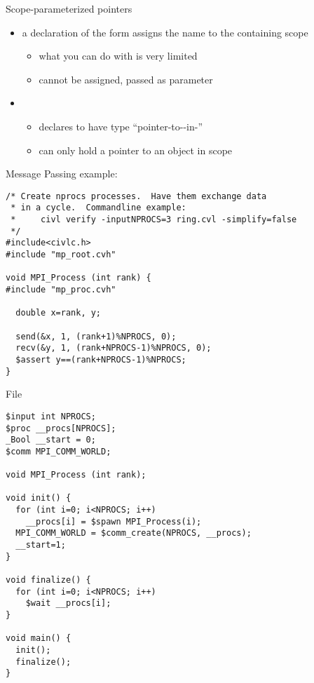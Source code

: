 \documentclass[t]{beamer}
\begin{document}
\begin{frame}{Scope-parameterized pointers}
  \begin{itemize}
  \item a declaration of the form  assigns the name
     to the containing scope
    \begin{itemize}
    \item what you can do with  is very limited
    \item cannot be assigned, passed as parameter
    \end{itemize}
  \item {}
    \begin{itemize}
    \item declares  to have type ``pointer-to--in-''
    \item {} can only hold a pointer to an object in scope 
    \end{itemize}
  \end{itemize}
\end{frame}









\begin{frame}[containsverbatim]{Message Passing example: }

\begin{verbatim}
/* Create nprocs processes.  Have them exchange data
 * in a cycle.  Commandline example:
 *     civl verify -inputNPROCS=3 ring.cvl -simplify=false
 */
#include<civlc.h>
#include "mp_root.cvh"

void MPI_Process (int rank) {
#include "mp_proc.cvh"

  double x=rank, y;

  send(&x, 1, (rank+1)%NPROCS, 0);
  recv(&y, 1, (rank+NPROCS-1)%NPROCS, 0);
  $assert y==(rank+NPROCS-1)%NPROCS;
}
\end{verbatim}
\end{frame}

\begin{frame}[containsverbatim]{File }
  \scriptsize
\begin{verbatim}
$input int NPROCS;
$proc __procs[NPROCS];
_Bool __start = 0;
$comm MPI_COMM_WORLD;

void MPI_Process (int rank);

void init() {
  for (int i=0; i<NPROCS; i++)
    __procs[i] = $spawn MPI_Process(i);
  MPI_COMM_WORLD = $comm_create(NPROCS, __procs);
  __start=1;
}

void finalize() {
  for (int i=0; i<NPROCS; i++)
    $wait __procs[i];
}

void main() {
  init();
  finalize();
}
\end{verbatim}
\end{frame}
\end{document}
